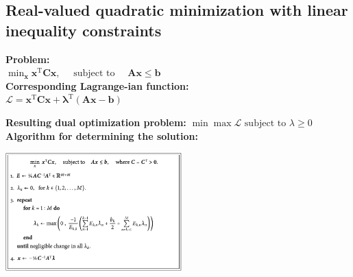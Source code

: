 \documentclass[english]{latex4ei/latex4ei_sheet}
\begin{document}
\begin{sectionbox}
  \subsection{Real-valued quadratic minimization with linear inequality constraints}
  \textbf{Problem:}\\
  $\min _{\boldsymbol{x}} \boldsymbol{x}^{\mathrm{T}} \boldsymbol{C} \boldsymbol{x}, \quad \text { subject to } \quad \boldsymbol{A} \boldsymbol{x} \leq \boldsymbol{b}$\\  
  
  \textbf{Corresponding Lagrange-ian function:}\\
  $\mathcal{L}=\boldsymbol{x}^{\mathrm{T}} \boldsymbol{C} \boldsymbol{x}+\boldsymbol{\lambda}^{\mathrm{T}}(\boldsymbol{A} \boldsymbol{x}-\boldsymbol{b})$
  
  \textbf{Resulting dual optimization problem:} $\min \max \mathcal{L} \text { subject to } \lambda \geq 0$\\

  \textbf{Algorithm for determining the solution:}
  \begin{center}
    \includegraphics[width = 6.8cm]{img/quadr-opt.png}
  \end{center}
\end{sectionbox}
\end{document}
